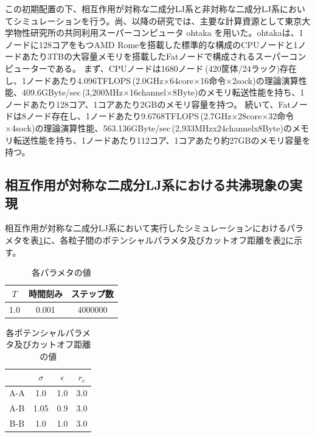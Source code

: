 \documentclass[titlepage]{jsreport}
\begin{document}
この初期配置の下、相互作用が対称な二成分LJ系と非対称な二成分LJ系においてシミュレーションを行う。尚、以降の研究では、主要な計算資源として東京大学物性研究所の共同利用スーパーコンピュータ ohtaka を用いた。ohtakaは、1ノードに128コアをもつAMD Romeを搭載した標準的な構成のCPUノードと1ノードあたり3TBの大容量メモリを搭載したFatノードで構成されるスーパーコンピューターである\cite{ohtaka}。
まず、CPUノードは1680ノード\,(420筐体/24ラック)存在し、1ノードあたり4.096TFLOPS\,(2.0GHz×64core×16命令×2sock)の理論演算性能、409.6GByte/sec\,(3,200MHz×16channel×8Byte)のメモリ転送性能を持ち、1ノードあたり128コア、1コアあたり2GBのメモリ容量を持つ。
続いて、Fatノードは8ノード存在し、1ノードあたり9.6768TFLOPS\,(2.7GHz×28core×32命令×4sock)の理論演算性能、563.136GByte/sec\,(2,933MHzx24channelx8Byte)のメモリ転送性能を持ち、1ノードあたり112コア、1コアあたり約27GBのメモリ容量を持つ。

\subsection{相互作用が対称な二成分LJ系における共沸現象の実現} \label{method-subsec:bi-symmetric-component-azeotrope}
相互作用が対称な二成分LJ系において実行したシミュレーションにおけるパラメタを表\ref{table:symmetric-bi-component-azeotrope-parameter}に、各粒子間のポテンシャルパラメタ及びカットオフ距離を表\ref{table:symmetric-bi-component-azeotrope-potential-parameter}に示す。

\begin{table}[htbp]
    \begin{center}
        \caption{各パラメタの値}
        \label{table:symmetric-bi-component-azeotrope-parameter}
            \begin{tabular}{c c c}
                $T$ & 時間刻み & ステップ数 \\
                \hline
                1.0 & 0.001 & 4000000 \\
            \end{tabular}
    \end{center}
\end{table}

\begin{table}[htbp]
    \begin{center}
        \caption{各ポテンシャルパラメタ及びカットオフ距離の値}
        \label{table:symmetric-bi-component-azeotrope-potential-parameter}
            \begin{tabular}{c | c c c}
                & $\sigma$ & $\epsilon$ & $r_c$ \\\hline
                A-A & 1.0 & 1.0 & 3.0 \\
                A-B & 1.05 & 0.9 & 3.0 \\
                B-B & 1.0 & 1.0 & 3.0
            \end{tabular}
    \end{center}
\end{table}
\end{document}
